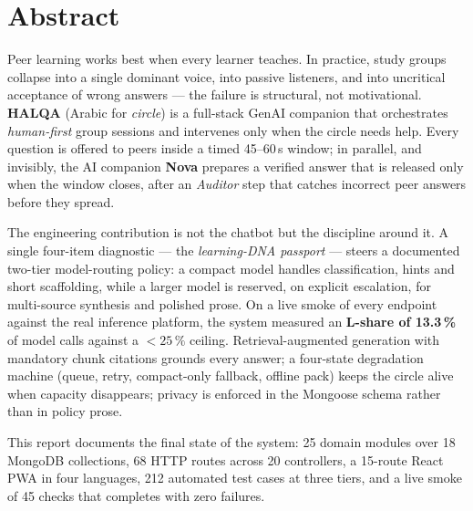 \documentclass[10pt,a4paper,oneside]{report}
\begin{document}
\thispagestyle{plain}
\chapter*{Abstract}

\noindent\color{ink1}
Peer learning works best when every learner teaches. In practice, study groups collapse
into a single dominant voice, into passive listeners, and into uncritical acceptance of
wrong answers --- the failure is structural, not motivational. \textbf{HALQA} (Arabic for
\emph{circle}) is a full-stack GenAI companion that orchestrates \emph{human-first} group
sessions and intervenes only when the circle needs help. Every question is offered to
peers inside a timed 45--60\,s window; in parallel, and invisibly, the AI companion
\textbf{Nova} prepares a verified answer that is released only when the window closes,
after an \emph{Auditor} step that catches incorrect peer answers before they spread.

The engineering contribution is not the chatbot but the discipline around it. A single
four-item diagnostic --- the \emph{learning-DNA passport} --- steers a documented
two-tier model-routing policy: a compact model handles classification, hints and short
scaffolding, while a larger model is reserved, on explicit escalation, for multi-source
synthesis and polished prose. On a live smoke of every endpoint against the real
inference platform, the system measured an \textbf{L-share of 13.3\,\%} of model calls
against a $<25\,\%$ ceiling. Retrieval-augmented generation with mandatory chunk
citations grounds every answer; a four-state degradation machine (queue, retry,
compact-only fallback, offline pack) keeps the circle alive when capacity disappears;
privacy is enforced in the Mongoose schema rather than in policy prose.

This report documents the final state of the system: 25 domain modules over 18 MongoDB
collections, 68 HTTP routes across 20 controllers, a 15-route React PWA in four
languages, 212 automated test cases at three tiers, and a live smoke of 45 checks that
completes with zero failures.

\vspace{0.7cm}
\end{document}

